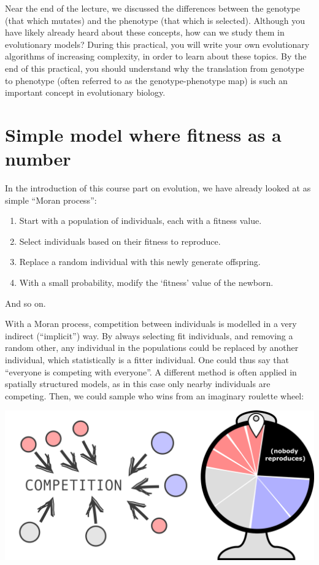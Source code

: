\documentclass[
  letterpaper,
  DIV=11,
  numbers=noendperiod]{scrreprt}
\providecommand{\tightlist}{%
  \setlength{\itemsep}{0pt}\setlength{\parskip}{0pt}}\usepackage{longtable,booktabs,array}
\theoremstyle{definition}
\theoremstyle{remark}
\begin{document}
Near the end of the lecture, we discussed the differences between the
genotype (that which mutates) and the phenotype (that which is
selected). Although you have likely already heard about these concepts,
how can we study them in evolutionary models? During this practical, you
will write your own evolutionary algorithms of increasing complexity, in
order to learn about these topics. By the end of this practical, you
should understand why the translation from genotype to phenotype (often
referred to as the genotype-phenotype map) is such an important concept
in evolutionary biology.

\section{Simple model where fitness as a
number}\label{simple-model-where-fitness-as-a-number}

In the introduction of this course part on evolution, we have already
looked at as simple ``Moran process'':

\begin{enumerate}
\def\labelenumi{\arabic{enumi}.}
\tightlist
\item
  Start with a population of individuals, each with a fitness value.
\item
  Select individuals based on their fitness to reproduce.
\item
  Replace a random individual with this newly generate offspring.
\item
  With a small probability, modify the `fitness' value of the newborn.
\end{enumerate}

And so on.

With a Moran process, competition between individuals is modelled in a
very indirect (``implicit'') way. By always selecting fit individuals,
and removing a random other, any individual in the populations could be
replaced by another individual, which statistically is a fitter
individual. One could thus say that ``everyone is competing with
everyone''. A different method is often applied in spatially structured
models, as in this case only nearby individuals are competing. Then, we
could sample who wins from an imaginary roulette wheel:

\includegraphics{images/roulette.png}
\end{document}
